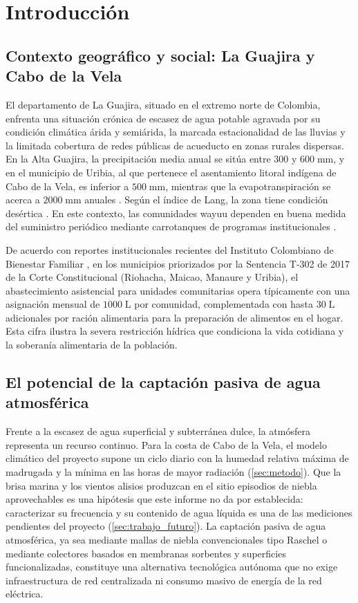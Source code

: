\chapter{Introducci\'on}
\label{cap:introduccion}

\section{Contexto geogr\'afico y social: La Guajira y Cabo de la Vela}
El departamento de La Guajira, situado en el extremo norte de Colombia, enfrenta una situaci\'on cr\'onica de escasez de agua potable agravada por su condici\'on clim\'atica \'arida y semi\'arida, la marcada estacionalidad de las lluvias y la limitada cobertura de redes p\'ublicas de acueducto en zonas rurales dispersas. En la Alta Guajira, la precipitaci\'on media anual se sit\'ua entre $300$ y $600\;\text{mm}$, y en el municipio de Uribia, al que pertenece el asentamiento litoral ind\'igena de Cabo de la Vela, es inferior a $500\;\text{mm}$, mientras que la evapotranspiraci\'on se acerca a $2000\;\text{mm}$ anuales \parencite{araujo2019agroclimatic}. Seg\'un el \'indice de Lang, la zona tiene condici\'on des\'ertica \parencite{ospina2017water}. En este contexto, las comunidades wayuu dependen en buena medida del suministro peri\'odico mediante carrotanques de programas institucionales \parencite{icbf2025agua}.

De acuerdo con reportes institucionales recientes del Instituto Colombiano de Bienestar Familiar \parencite{icbf2025agua}, en los municipios priorizados por la Sentencia T-302 de 2017 de la Corte Constitucional \parencite{corte2017t302} (Riohacha, Maicao, Manaure y Uribia), el abastecimiento asistencial para unidades comunitarias opera t\'ipicamente con una asignaci\'on mensual de $1000\;\text{L}$ por comunidad, complementada con hasta $30\;\text{L}$ adicionales por raci\'on alimentaria para la preparaci\'on de alimentos en el hogar. Esta cifra ilustra la severa restricci\'on h\'idrica que condiciona la vida cotidiana y la soberan\'ia alimentaria de la poblaci\'on.

\section{El potencial de la captaci\'on pasiva de agua atmosf\'erica}
Frente a la escasez de agua superficial y subterr\'anea dulce, la atm\'osfera representa un recurso continuo. Para la costa de Cabo de la Vela, el modelo clim\'atico del proyecto supone un ciclo diario con la humedad relativa m\'axima de madrugada y la m\'inima en las horas de mayor radiaci\'on (\cref{sec:metodo}). Que la brisa marina y los vientos alisios produzcan en el sitio episodios de niebla aprovechables es una hip\'otesis que este informe no da por establecida: caracterizar su frecuencia y su contenido de agua l\'iquida es una de las mediciones pendientes del proyecto (\cref{sec:trabajo_futuro}). La captaci\'on pasiva de agua atmosf\'erica, ya sea mediante mallas de niebla convencionales tipo Raschel o mediante colectores basados en membranas sorbentes y superficies funcionalizadas, constituye una alternativa tecnol\'ogica aut\'onoma que no exige infraestructura de red centralizada ni consumo masivo de energ\'ia de la red el\'ectrica.

